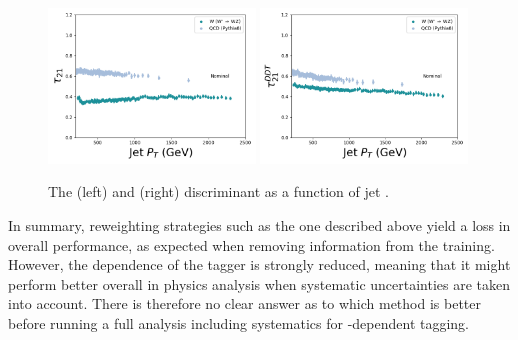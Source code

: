 \begin{figure}[h!]
\centering
\includegraphics[width=0.49\textwidth]{figures/vtagging/lola/tau21_-profile-jpt.png}
\includegraphics[width=0.49\textwidth]{figures/vtagging/lola/ddt_-profile-jpt.png}
\caption{The \nsubj (left) and \ddt (right) discriminant as a function of jet \PT.}
\label{fig:lola:nsubjcorr}
\end{figure}
In summary, reweighting strategies such as the one described above yield a loss in overall performance, as expected when removing information from the training. However, the \PT dependence of the tagger is strongly reduced, meaning that it might perform better overall in physics analysis when systematic uncertainties are taken into account. There is therefore no clear answer as to which method is better before running a full analysis including systematics for \PT-dependent tagging.
 
